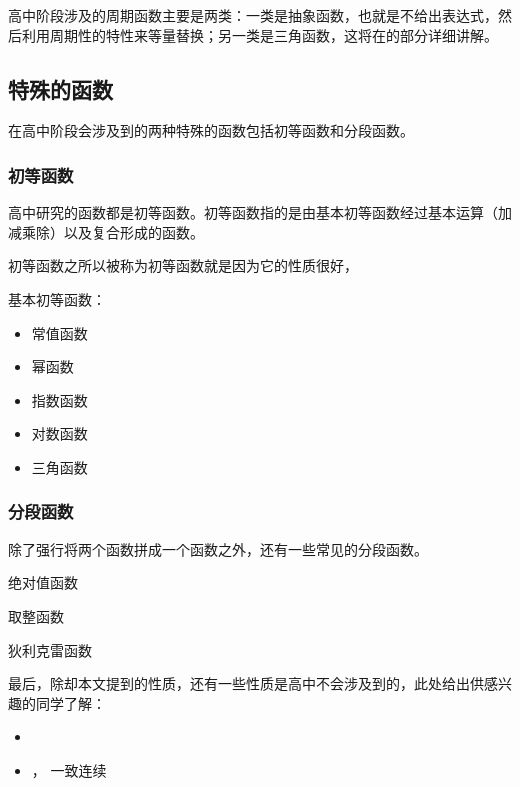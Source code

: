 高中阶段涉及的周期函数主要是两类：一类是抽象函数，也就是不给出表达式，然后利用周期性的特性来等量替换；另一类是三角函数，这将在的部分详细讲解。

\subsection{特殊的函数}

在高中阶段会涉及到的两种特殊的函数包括初等函数和分段函数。

\subsubsection{初等函数}

高中研究的函数都是初等函数。初等函数指的是由基本初等函数经过基本运算（加减乘除）以及复合形成的函数。

初等函数之所以被称为初等函数就是因为它的性质很好，

基本初等函数：
\begin{itemize}
\item 常值函数
\item 幂函数
\item 指数函数
\item 对数函数
\item 三角函数
\end{itemize}

\subsubsection{分段函数}

除了强行将两个函数拼成一个函数之外，还有一些常见的分段函数。

绝对值函数

取整函数

狄利克雷函数

最后，除却本文提到的性质，还有一些性质是高中不会涉及到的，此处给出供感兴趣的同学了解：
\begin{itemize}
\item {}
\item {}， 一致连续
\end{itemize}